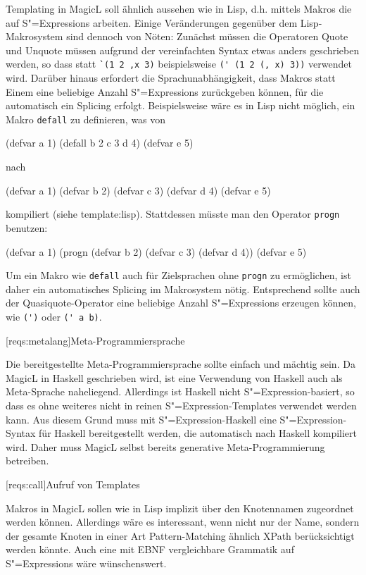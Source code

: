 \documentclass[11pt, a4paper, bibgerm]{scrbook}
\newcommand\icode[1]{\lstinline?#1?}
\newcommand\lsection{}
\newcommand\sref{}
\newcommand{\sees}[1]{(siehe \sref{#1})}
\newcommand{\sexp}{S"=Expression}
\newcommand{\sexps}{S"=Expressions}
\begin{document}
Templating in MagicL soll ähnlich aussehen wie in Lisp, d.h. mittels
Makros die auf \sexps{} arbeiten. Einige Veränderungen gegenüber dem
Lisp-Makrosystem sind dennoch von Nöten: Zunächst müssen die Operatoren
Quote und Unquote müssen aufgrund der vereinfachten Syntax etwas anders
geschrieben werden, so dass statt \icode{`(1 2 ,x 3)} beispielsweise
\icode{(' (1 2 (, x) 3))} verwendet wird. Darüber hinaus erfordert die
Sprachunabhängigkeit, dass Makros statt Einem eine beliebige Anzahl
\sexps{} zurückgeben können, für die automatisch ein Splicing
erfolgt. Beispielsweise wäre es in Lisp nicht möglich, ein Makro
\icode{defall} zu definieren, was von
\begin{code}
(defvar a 1)
(defall b 2 c 3 d 4)
(defvar e 5)
\end{code}
nach
\begin{code}
(defvar a 1)
(defvar b 2)
(defvar c 3)
(defvar d 4)
(defvar e 5)  
\end{code}
kompiliert \sees{template:lisp}. Stattdessen müsste man den Operator
\icode{progn} benutzen:
\begin{code}
(defvar a 1)
(progn
  (defvar b 2)
  (defvar c 3)
  (defvar d 4))
(defvar e 5)  
\end{code}
Um ein Makro wie \icode{defall} auch für Zielsprachen ohne \icode{progn} zu
ermöglichen, ist daher ein automatisches Splicing im Makrosystem
nötig. Entsprechend sollte auch der Quasiquote-Operator eine beliebige
Anzahl \sexps{} erzeugen können, wie \icode{(')} oder \icode{(' a b)}.

\lsection[reqs:metalang]{Meta-Programmiersprache}

Die bereitgestellte Meta-Programmiersprache sollte einfach und mächtig
sein. Da MagicL in Haskell geschrieben wird, ist eine Verwendung von
Haskell auch als Meta-Sprache naheliegend. Allerdings ist Haskell nicht
\sexp{}-basiert, so dass es ohne weiteres nicht in reinen
\sexp{}-Templates verwendet werden kann. Aus diesem Grund muss mit
\sexp{}-Haskell eine \sexp{}-Syntax für Haskell bereitgestellt werden,
die automatisch nach Haskell kompiliert wird. Daher muss MagicL selbst
bereits generative Meta-Programmierung betreiben.

\lsection[reqs:call]{Aufruf von Templates}

Makros in MagicL sollen wie in Lisp implizit über den Knotennamen
zugeordnet werden können. Allerdings wäre es interessant, wenn nicht nur
der Name, sondern der gesamte Knoten in einer Art Pattern-Matching
ähnlich XPath berücksichtigt werden könnte. Auch eine mit EBNF
\cite[S.43f]{EBNF} vergleichbare Grammatik auf \sexps{} wäre
wünschenswert. 
\end{document}

